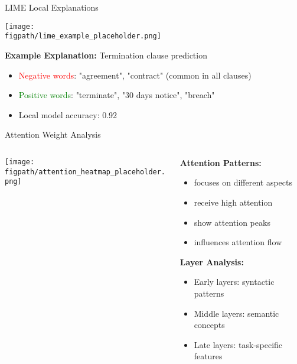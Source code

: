 \begin{frame}{LIME Local Explanations}
\begin{center}
\texttt{[image: \\figpath/lime\_example\_placeholder.png]}
\end{center}

\textbf{Example Explanation:} Termination clause prediction
\begin{itemize}
    \item \textcolor{red}{Negative words}: "agreement", "contract" (common in all clauses)
    \item \textcolor{green}{Positive words}: "terminate", "30 days notice", "breach"
    \item Local model accuracy: 0.92
\end{itemize}
\end{frame}

\begin{frame}{Attention Weight Analysis}
\begin{columns}
\begin{column}{0.6\textwidth}
\begin{center}
\texttt{[image: \\figpath/attention\_heatmap\_placeholder.png]}
\end{center}
\end{column}
\begin{column}{0.4\textwidth}
\textbf{Attention Patterns:}
\begin{itemize}
    \item {} focuses on different aspects
    \item {} receive high attention
    \item {} show attention peaks
    \item {} influences attention flow
\end{itemize}

\vspace{0.5cm}
\textbf{Layer Analysis:}
\begin{itemize}
    \item Early layers: syntactic patterns
    \item Middle layers: semantic concepts
    \item Late layers: task-specific features
\end{itemize}
\end{column}
\end{columns}
\end{frame}


